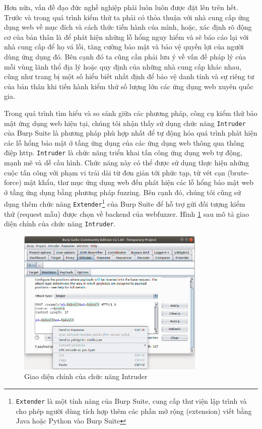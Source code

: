 Hơn nữa, vấn đề đạo đức nghề nghiệp phải luôn luôn được đặt lên trên hết. Trước và trong quá trình kiểm thử ta phải có thỏa thuận với nhà cung cấp ứng dụng web về mục đích và cách thức tiến hành của mình, hoặc, xác định rõ động cơ của bản thân là để phát hiện những lỗ hổng nguy hiểm và sẽ báo cáo lại với nhà cung cấp để họ vá lỗi, tăng cường bảo mật và bảo vệ quyền lợi của người dùng ứng dụng đó. Bên cạnh đó ta cũng cần phải lưu ý về vấn đề pháp lý của mỗi vùng lãnh thổ địa lý hoặc quy định của những nhà cung cấp khác nhau, cũng như trang bị một số hiểu biết nhất định để bảo vệ danh tính và sự riêng tư của bản thân khi tiến hành kiểm thử số lượng lớn các ứng dụng web xuyên quốc gia.\par
Trong quá trình tìm hiểu và so sánh giữa các phương pháp, công cụ kiểm thử bảo mật ứng dụng web hiện tại, chúng tôi nhận thấy sử dụng chức năng \texttt{Intruder} của Burp Suite là phương pháp phù hợp nhất để tự động hóa quá trình phát hiện các lỗ hổng bảo mật ở tầng ứng dụng của các ứng dụng web thông qua thông điệp \acrshort{http}. \texttt{Intruder} là chức năng triển khai tấn công ứng dụng web tự động, mạnh mẽ và dễ cấu hình. Chức năng này có thể được sử dụng thực hiện những cuộc tấn công với phạm vi trải dài từ đơn giản tới phức tạp, từ vét cạn (brute-force) mật khẩu, thư mục ứng dụng web đến phát hiện các lỗ hổng bảo mật web ở tầng ứng dụng bằng phương pháp fuzzing. 
Bên cạnh đó, chúng tôi cũng sử dụng thêm chức năng \texttt{Extender}\footnote{\texttt{Extender} là một tính năng của Burp Suite, cung cấp thư viện lập trình và cho phép người dùng tích hợp thêm các phần mở rộng (extension) viết bằng Java hoặc Python vào Burp Suite} của Burp Suite để hỗ trợ gửi đối tượng kiểm thử (request mẫu) được chọn về backend của webfuzzer. Hình \ref{fig:send-base-request-1} sau mô tả giao diện chính của chức năng \texttt{Intruder}.
\begin{figure}[H]
    \centering
        \includegraphics[width=0.8\textwidth,keepaspectratio=true]{images/send-base-request.png}
    \caption{Giao diện chính của chức năng Intruder}
    \label{fig:send-base-request-1}
\end{figure}
